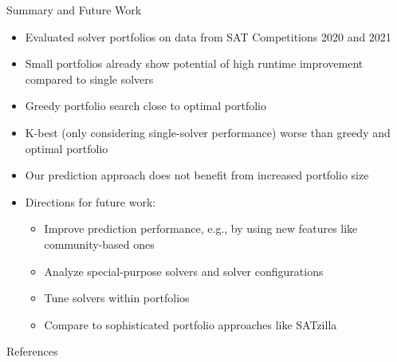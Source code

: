 \documentclass[en]{sdqbeamer}
\begin{document}
\begin{frame}[t]{Summary and Future Work}
	\begin{itemize}
		\item Evaluated solver portfolios on data from SAT Competitions 2020 and 2021
		\pause
		\item Small portfolios already show potential of high runtime improvement compared to single solvers
		\pause
		\item Greedy portfolio search close to optimal portfolio
		\pause
		\item K-best (only considering single-solver performance) worse than greedy and optimal portfolio
		\pause
		\item Our prediction approach does not benefit from increased portfolio size
		\pause
		\vspace{\baselineskip}
		\item Directions for future work:
		\begin{itemize}
			\item Improve prediction performance, e.g., by using new features like community-based ones~\cite{Ansotegui:2019:CommunityStructure, Li:2021:HCS}
			\pause
			\item Analyze special-purpose solvers and solver configurations
			\pause
			\item Tune solvers within portfolios~\cite{Kadioglu:2010:ISAC}
			\pause
			\item Compare to sophisticated portfolio approaches like SATzilla~\cite{xu2008satzilla, xu2012satzilla2012}
		\end{itemize}
	\end{itemize}
\end{frame}

\appendix
\beginbackup %

\begin{frame}[t, allowframebreaks]{References}
	\printbibliography
\end{frame}

\backupend
\end{document}
